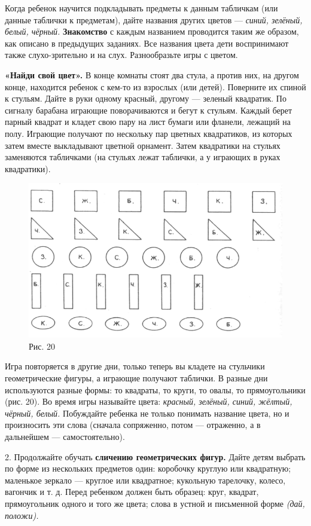 \documentclass{book}
\renewcommand{\emph}[1]{\textit{#1}}
\begin{document}
Когда ребенок научится подкладывать предметы к данным табличкам (или
данные таблички к предметам), дайте названия других цветов ---
\emph{синий, зелёный, белый, чёрный.} \textbf{Знакомство} с каждым
названием проводится таким же образом, как описано в предыдущих
заданиях. Все названия цвета дети воспринимают также слухо-зрительно и
на слух. Разнообразьте игры с цветом.

\textbf{«Найди свой цвет».} В конце комнаты стоят два стула, а против
них, на другом конце, находится ребенок с кем-то из взрослых (или
детей). Поверните их спиной к стульям. Дайте в руки одному красный,
другому --- зеленый квадратик. По сигналу барабана играющие
поворачиваются и бегут к стульям. Каждый берет парный квадрат и кладет
свою пару на лист бумаги или фланели, лежащий на полу. Играющие получают
по нескольку пар цветных квадратиков, из которых затем вместе
выкладывают цветной орнамент. Затем квадратики на стульях заменяются
табличками (на стульях лежат таблички, а у играющих в руках квадратики).

\begin{figure}
\centering
\includegraphics[width=\linewidth]{media/media/image17.png}
\caption*{Рис. 20}
\end{figure}


Игра повторяется в другие дни, только теперь вы кладете на стульчики
геометрические фигуры, а играющие получают таблички. В разные дни
используются разные формы: то квадраты, то круги, то овалы, то
прямоугольники (рис. 20). Во время игры называйте цвета: \emph{красный,
зелёный, синий, жёлтый, чёрный, белый.} Побуждайте ребенка не только
понимать название цвета, но и произносить эти слова (сначала сопряженно,
потом --- отраженно, а в дальнейшем --- самостоятельно).

2. Продолжайте обучать \textbf{сличению геометрических фигур.} Дайте
детям выбрать по форме из нескольких предметов один: коробочку круглую
или квадратную; маленькое зеркало --- круглое или квадратное; кукольную
тарелочку, колесо, вагончик и т. д. Перед ребенком должен быть образец:
круг, квадрат, прямоугольник одного и того же цвета; слова в устной и
письменной форме \emph{(дай, положи).}
\end{document}
